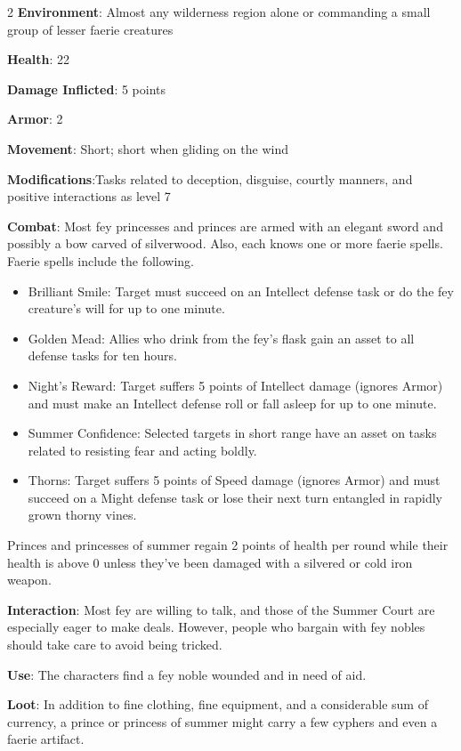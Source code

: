 \begin{multicols}{2}
\textbf{Environment}: Almost any wilderness region alone or commanding a small group of lesser faerie creatures 

\textbf{Health}: 22

\textbf{Damage Inflicted}: 5 points

\textbf{Armor}: 2

\textbf{Movement}: Short; short when gliding on the wind

\textbf{Modifications}:Tasks related to deception, disguise, courtly manners, and positive interactions as level 7

\textbf{Combat}: Most fey princesses and princes are armed with an elegant sword and possibly a bow carved of silverwood. Also, each knows one or more faerie spells. Faerie spells include the following.

\begin{itemize}
\item Brilliant Smile: Target must succeed on an Intellect defense task or do the fey creature’s will for up to one minute.
\item Golden Mead: Allies who drink from the fey’s flask gain an asset to all defense tasks for ten hours.
\item Night’s Reward: Target suffers 5 points of Intellect damage (ignores Armor) and must make an Intellect defense roll or fall asleep for up to one minute.
\item Summer Confidence: Selected targets in short range have an asset on tasks related to resisting fear and acting boldly.
\item Thorns: Target suffers 5 points of Speed damage (ignores Armor) and must succeed on a Might defense task or lose their next turn entangled in rapidly grown thorny vines.
\end{itemize}

Princes and princesses of summer regain 2 points of health per round while their health is above 0 unless they’ve been damaged with a silvered or cold iron weapon.

\textbf{Interaction}: Most fey are willing to talk, and those of the Summer Court are especially eager to make deals. However, people who bargain with fey nobles should take care to avoid being tricked.

\textbf{Use}: The characters find a fey noble wounded and in need of aid.

\textbf{Loot}: In addition to fine clothing, fine equipment, and a considerable sum of currency, a prince or princess of summer might carry a few cyphers and even a faerie artifact.


\end{multicols}
